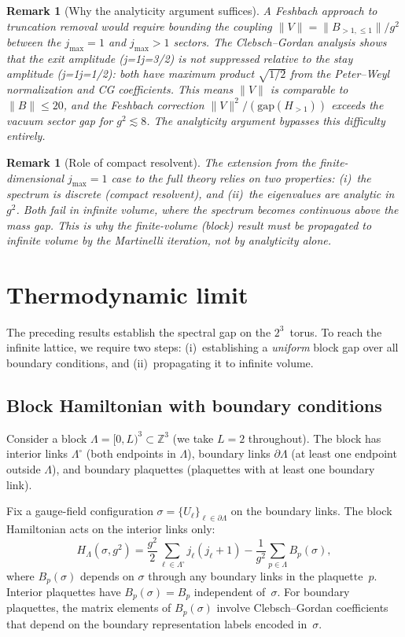 \documentclass[12pt,a4paper]{article}
\newtheorem{remark}[theorem]{Remark}
\newcommand{\Z}{\mathbb{Z}}
\begin{document}
\begin{remark}[Why the analyticity argument suffices]
A Feshbach approach to truncation removal would require bounding the coupling $\|V\|=\|B_{>1,\le 1}\|/g^2$ between the $j_{\max}{=}1$ and $j_{\max}{>}1$ sectors. The Clebsch--Gordan analysis shows that the exit amplitude (j{=}1{\to}j{=}3/2) is \emph{not} suppressed relative to the stay amplitude (j{=}1{\to}j{=}1/2): both have maximum product $\sqrt{1/2}$ from the Peter--Weyl normalization and CG coefficients. This means $\|V\|$ is comparable to $\|B\|\le 20$, and the Feshbach correction $\|V\|^2/(\mathrm{gap}(H_{>1}))$ exceeds the vacuum sector gap for $g^2\lesssim 8$. The analyticity argument bypasses this difficulty entirely.
\end{remark}

\begin{remark}[Role of compact resolvent]
The extension from the finite-dimensional $j_{\max}=1$ case to the full theory relies on two properties: (i)~the spectrum is discrete (compact resolvent), and (ii)~the eigenvalues are analytic in~$g^2$. Both fail in infinite volume, where the spectrum becomes continuous above the mass gap. This is why the finite-volume (block) result must be propagated to infinite volume by the Martinelli iteration, not by analyticity alone.
\end{remark}


\section{Thermodynamic limit}\label{sec:thermo}

The preceding results establish the spectral gap on the $2^3$~torus. To reach the infinite lattice, we require two steps: (i)~establishing a \emph{uniform} block gap over all boundary conditions, and (ii)~propagating it to infinite volume.

\subsection{Block Hamiltonian with boundary conditions}

Consider a block $\Lambda=[0,L)^3\subset\Z^3$ (we take $L=2$ throughout). The block has interior links $\Lambda^\circ$ (both endpoints in $\Lambda$), boundary links $\partial\Lambda$ (at least one endpoint outside $\Lambda$), and boundary plaquettes (plaquettes with at least one boundary link).

Fix a gauge-field configuration $\sigma=\{U_\ell\}_{\ell\in\partial\Lambda}$ on the boundary links. The block Hamiltonian acts on the interior links only:
\begin{equation}
H_\Lambda(\sigma, g^2) = \frac{g^2}{2}\sum_{\ell\in\Lambda^\circ} j_\ell(j_\ell+1) - \frac{1}{g^2}\sum_{p\in\Lambda} B_p(\sigma),
\end{equation}
where $B_p(\sigma)$ depends on $\sigma$ through any boundary links in the plaquette~$p$. Interior plaquettes have $B_p(\sigma)=B_p$ independent of~$\sigma$. For boundary plaquettes, the matrix elements of $B_p(\sigma)$ involve Clebsch--Gordan coefficients that depend on the boundary representation labels encoded in~$\sigma$.
\end{document}
